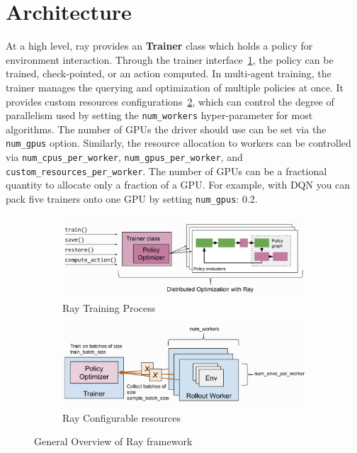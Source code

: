 \section{Architecture}

At a high level, ray provides an \textbf{\colorbox{gray!20}{Trainer}} class which holds a policy for environment interaction. Through the trainer interface~\ref{fig:ray_trainer}, the policy can be trained, check-pointed, or an action computed. In multi-agent training, the trainer manages the querying and optimization of multiple policies at once. It provides custom resources configurations~\ref{fig:ray_config}, which can control the degree of parallelism used by setting the \colorbox{gray!20}{\texttt{num\_workers}} hyper-parameter for most algorithms. The number of GPUs the driver should use can be set via the \colorbox{gray!20}{\texttt{num\_gpus}} option. Similarly, the resource allocation to workers can be controlled via \colorbox{gray!20}{\texttt{num\_cpus\_per\_worker}}, \colorbox{gray!20}{\texttt{num\_gpus\_per\_worker}}, and \colorbox{gray!20}{\texttt{custom\_resources\_per\_worker}}. The number of GPUs can be a fractional quantity to allocate only a fraction of a GPU. For example, with DQN you can pack five trainers onto one GPU by setting \colorbox{gray!20}{\texttt{num\_gpus}: 0.2}.

\begin{figure}[!htb]
		\centering
		\begin{subfigure}[b]{0.4\textwidth}
				\centering
				\includegraphics[width=\textwidth]{figures/architecture/ray_trainer.png}
				\caption{Ray Training Process}
				\label{fig:ray_trainer}
		\end{subfigure}
		\hfill
		\begin{subfigure}[b]{0.4\textwidth}
				\centering
				\includegraphics[width=\textwidth]{figures/architecture/ray_config.png}
				\caption{Ray Configurable resources}
				\label{fig:ray_config}
		\end{subfigure}
		\hfill
		 \caption{General Overview of Ray framework~\parencite{moritz2018ray}}
		 \label{fig:ray}
\end{figure}

